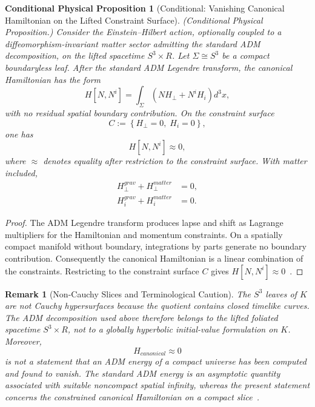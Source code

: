 \documentclass[11pt]{article}
\theoremstyle{canonmath}
\newtheorem{remark}[theorem]{Remark}
\theoremstyle{canonpostulate}
\theoremstyle{canonproposition}
\newtheorem{proposition}{Conditional Physical Proposition}[section]
\providecommand{\Klein}{\mathcal{K}}
\providecommand{\R}{\mathbb{R}}
\providecommand{\Sthree}{S^3}
\def\mathrm#1{#1}%
\def\mathbb#1{#1}%
\def\mathcal#1{#1}%
\begin{document}
\begin{proposition}[Conditional: Vanishing Canonical Hamiltonian on the Lifted Constraint Surface] \label{prop:hamiltonian}
\emph{(Conditional Physical Proposition.)} Consider the Einstein--Hilbert action, optionally coupled to a diffeomorphism-invariant matter sector admitting the standard ADM decomposition, on the lifted spacetime $\Sthree\times\R$. Let $\Sigma\cong\Sthree$ be a compact boundaryless leaf. After the standard ADM Legendre transform, the canonical Hamiltonian has the form
\begin{equation}
H[N,N^i]=\int_\Sigma\left(N\mathcal H_\perp+N^i\mathcal H_i\right)d^3x,
\end{equation}
with no residual spatial boundary contribution. On the constraint surface
\[
\mathcal C:=\left\{\mathcal H_\perp=0,\;\mathcal H_i=0\right\},
\]
one has
\[
H[N,N^i]\approx0,
\]
where $\approx$ denotes equality after restriction to the constraint surface. With matter included,
\begin{align}
\mathcal H_\perp^{\mathrm{grav}}+\mathcal H_\perp^{\mathrm{matter}}&=0,\\
\mathcal H_i^{\mathrm{grav}}+\mathcal H_i^{\mathrm{matter}}&=0.
\end{align}
\end{proposition}
\begin{proof}
The ADM Legendre transform produces lapse and shift as Lagrange multipliers for the Hamiltonian and momentum constraints. On a spatially compact manifold without boundary, integrations by parts generate no boundary contribution. Consequently the canonical Hamiltonian is a linear combination of the constraints. Restricting to the constraint surface $\mathcal C$ gives $H[N,N^i]\approx0$~\cite{wald,adm}.
\end{proof}

\begin{remark}[Non-Cauchy Slices and Terminological Caution]
The $\Sthree$ leaves of $\Klein$ are not Cauchy hypersurfaces because the quotient contains closed timelike curves. The ADM decomposition used above therefore belongs to the lifted foliated spacetime $\Sthree\times\R$, not to a globally hyperbolic initial-value formulation on $\Klein$. Moreover,
\[
H_{\mathrm{canonical}}\approx0
\]
is not a statement that an ADM energy of a compact universe has been computed and found to vanish. The standard ADM energy is an asymptotic quantity associated with suitable noncompact spatial infinity, whereas the present statement concerns the constrained canonical Hamiltonian on a compact slice~\cite{wald,adm}.
\end{remark}
\end{document}
